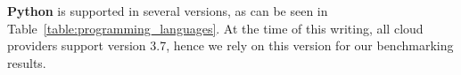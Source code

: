 \textbf{Python} is supported in several versions, as can be seen in Table~\ref{table:programming_languages}. %
At the time of this writing, all cloud providers support version 3.7, hence we rely on this version for our benchmarking results.



